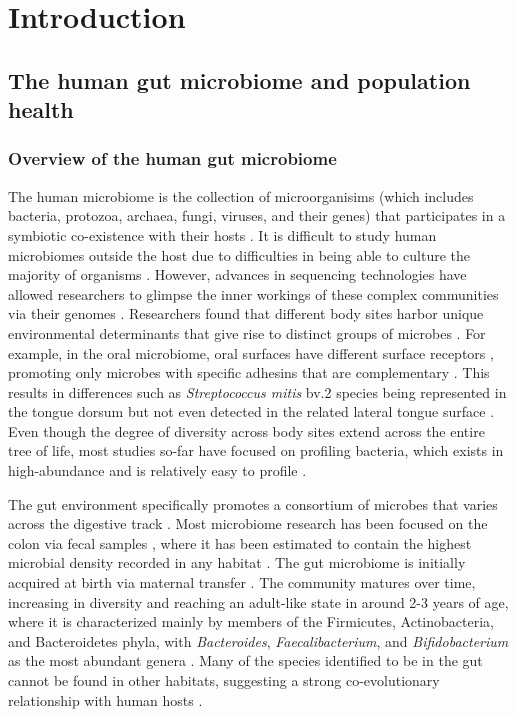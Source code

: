 \chapter{Introduction}

\section{The human gut microbiome and population health}
\subsection{Overview of the human gut microbiome}

The human microbiome is the collection of microorganisims (which includes bacteria, protozoa, archaea, fungi, viruses, and their genes) that participates in a symbiotic co-existence with their hosts \cite{ursell2012defining}. It is difficult to study human microbiomes outside the host due to difficulties in being able to culture the majority of organisms \cite{walker2014phylogeny}. However, advances in sequencing technologies have allowed researchers to glimpse the inner workings of these complex communities via their genomes \cite{zuniga2017elucidation}. Researchers found that different body sites harbor unique environmental determinants that give rise to distinct groups of microbes \cite{consortium2012structure}. For example, in the oral microbiome, oral surfaces have different surface receptors \cite{gibbons1989bacterial}, promoting only microbes with specific adhesins that are complementary \cite{aas2005defining}. This results in differences such as \emph{Streptococcus mitis} bv.2 species being represented in the tongue dorsum but not even detected in the related lateral tongue surface \cite{aas2005defining}. Even though the degree of diversity across body sites extend across the entire tree of life, most studies so-far have focused on profiling bacteria, which exists in high-abundance and is relatively easy to profile \cite{cani2018human}. 

The gut environment specifically promotes a consortium of microbes that varies across the digestive track \cite{mailhe2018repertoire, donaldson2016gut}. Most microbiome research has been focused on the colon via fecal samples \cite{tang2020current}, where it has been estimated to contain the highest microbial density recorded in any habitat \cite{shapira2016gut}. The gut microbiome is initially acquired at birth via maternal transfer \cite{shao2019stunted, backhed2015dynamics, yassour2016natural}. The community matures over time, increasing in diversity and reaching an adult-like state in around 2-3 years of age, where it is characterized mainly by members of the Firmicutes, Actinobacteria, and Bacteroidetes phyla, with \emph{Bacteroides}, \emph{Faecalibacterium}, and \emph{Bifidobacterium} as the most abundant genera \cite{king2019baseline, metahitconsortiumadditionalmembers2011enterotypes}. Many of the species identified to be in the gut cannot be found in other habitats, suggesting a strong co-evolutionary relationship with human hosts \cite{ley2006ecological}.  


